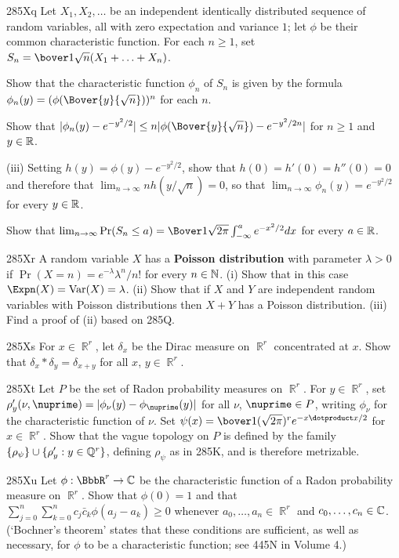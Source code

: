 {\sqheader 285Xq Let $X_1,X_2,\ldots$ be an independent identically
distributed sequence of random variables, all with zero expectation and
variance $1$;  let $\phi$ be their common characteristic function.   For
each $n\ge 1$, set $S_n=\bover1{\sqrt{n}}(X_1+\ldots+X_n)$.

 Show that the characteristic function $\phi_n$ of $S_n$
is given by the formula $\phi_n(y)=(\phi(\Bover{y}{\sqrt{n}}))^{n}$
for each $n$.

 Show that
$|\phi_n(y)-e^{-y^2/2}|\le n|\phi(\Bover{y}{\sqrt{n}})-e^{-y^2/2n}|$
for $n\ge 1$ and $y\in\Bbb R$.

\ifdim\pagewidth>467pt\fontdimen3\tenrm=3.33pt\fi
\quad(iii) Setting $h(y)=\phi(y)-e^{-y^2/2}$, show that
$h(0)=h'(0)=h''(0)=0$ and therefore that
$\lim_{n\to\infty} nh(y/\sqrt{n})=0$, so that
$\lim_{n\to\infty}\phi_n(y)=e^{-y^2/2}$ for every $y\in\Bbb R$.
\tenrm=1.67pt

 Show that $\lim_{n\to\infty}\Pr(S_n\le a)
=\Bover1{\sqrt{2\pi}}\int_{-\infty}^ae^{-x^2/2}dx$ for every
$a\in\Bbb R$.

\sqheader 285Xr
A random variable $X$ has a {\bf Poisson distribution}
with parameter $\lambda>0$ if $\Pr(X=n)=e^{-\lambda}\lambda^n/n!$ for
every $n\in\Bbb N$.    (i) Show that in this case
$\Expn(X)=\Var(X)=\lambda$.   (ii) Show that if $X$ and $Y$ are
independent random variables with Poisson distributions then $X+Y$ has a
Poisson distribution.   (iii) Find a proof of (ii) based on 285Q.

\sqheader 285Xs For $x\in\BbbR^r$, let $\delta_x$ be the Dirac measure
on $\BbbR^r$ concentrated at $x$.
Show that $\delta_x*\delta_y=\delta_{x+y}$ for all $x$, $y\in\BbbR^r$.

\spheader 285Xt Let $P$ be the set of Radon probability measures
on $\BbbR^r$.   For $y\in\BbbR^r$, set
$\rho'_y(\nu,\nuprime)=|\phi_{\nu}(y)-\phi_{\nuprime}(y)|$ for all $\nu$,
$\nuprime\in P$, writing $\phi_{\nu}$ for the characteristic function of
$\nu$.   Set $\psi(x)=\bover1{(\sqrt{2\pi})^r}e^{-x\dotproduct x/2}$ for
$x\in\BbbR^r$.    Show that the vague topology on $P$ is
defined by the family $\{\rho_{\psi}\}\cup\{\rho'_y:y\in\Bbb Q^r\}$,
defining $\rho_{\psi}$ as in 285K, and is therefore metrizable.

\sqheader 285Xu
Let $\phi:\BbbR^r\to\Bbb C$ be the
characteristic function of a Radon probability measure on $\BbbR^r$.
Show that $\phi(0)=1$ and that
$\sum_{j=0}^n\sum_{k=0}^nc_j\bar c_k\phi(a_j-a_k)\ge 0$ whenever
$a_0,\ldots,a_n\in\BbbR^r$ and $c_0,\ldots,c_n\in\Bbb C$.
(`Bochner's theorem' states that these conditions are
sufficient, as well as necessary, for $\phi$ to be a characteristic
function;  see 445N in Volume 4.)

}
